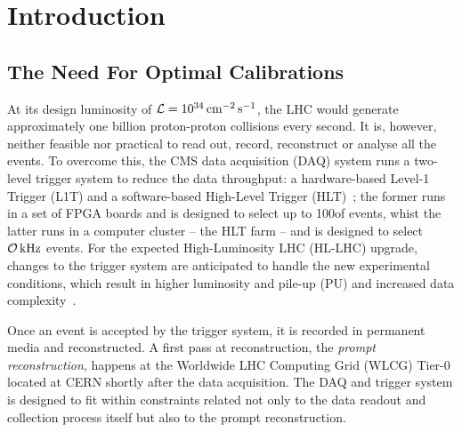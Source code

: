 \chapter{Introduction}

\section{The Need For Optimal Calibrations}
At its design luminosity of $\mathcal{L} = 10^{34}\,\text{cm}^{-2}\,\text{s}^{-1}$, the LHC would generate approximately one billion proton-proton collisions every second. It is, however, neither feasible nor practical to read out, record, reconstruct or analyse all the events. To overcome this, the CMS data acquisition (DAQ) system runs a two-level trigger system to reduce the data throughput: a hardware-based Level-1 Trigger (L1T) and a software-based High-Level Trigger (HLT)~\cite{CMS:2016ngn}; the former runs in a set of FPGA boards and is designed to select up to 100\kHz of events, whist the latter runs in a computer cluster -- the HLT farm -- and is designed to select $\mathcal{O}\,\text{kHz}$ events. For the expected High-Luminosity LHC (HL-LHC) upgrade, changes to the trigger system are anticipated to handle the new experimental conditions, which result in higher luminosity and pile-up (PU) and increased data complexity~\cite{Collaboration:2759072, CERN-LHCC-2020-004}. 

Once an event is accepted by the trigger system, it is recorded in permanent media and reconstructed. A first pass at reconstruction, the \emph{prompt reconstruction}, happens at the Worldwide LHC Computing Grid (WLCG) Tier-0 located at CERN shortly after the data acquisition. The DAQ and trigger system is designed to fit within constraints related not only to the data readout and collection process itself but also to the prompt reconstruction.

